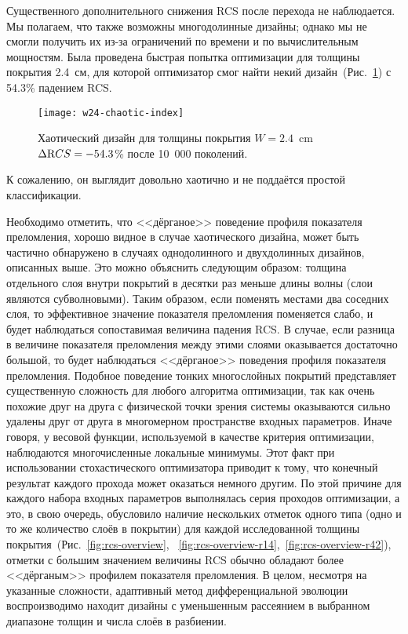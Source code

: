Существенного дополнительного снижения RCS после перехода
не наблюдается. Мы полагаем, что также возможны многодолинные дизайны;
однако мы не смогли получить их из-за ограничений по времени и по
вычислительным мощностям. Была проведена быстрая попытка оптимизации
для толщины покрытия 2.4~см, для которой оптимизатор смог найти некий
дизайн~(Рис.~\ref{fig:thick}) с 54.3\% падением RCS.
\begin{figure}
  \texttt{[image: w24-chaotic-index]}%
  \caption{Хаотический дизайн для толщины покрытия $W=2.4$~cm
    $\Delta {\textrm RCS}=-54.3$\% после 10~000 поколений.
    \label{fig:thick}}%
\end{figure}
К сожалению, он выглядит довольно хаотично и не поддаётся простой
классификации.


Необходимо отметить, что <<дёрганое>> поведение профиля показателя
преломления, хорошо видное в случае хаотического дизайна, может быть
частично обнаружено в случаях однодолинного и двухдолинных дизайнов,
описанных выше.  Это можно объяснить следующим образом: толщина
отдельного слоя внутри покрытий в десятки раз меньше длины волны (слои
являются субволновыми).  Таким образом, если поменять местами два
соседних слоя, то эффективное значение показателя преломления
поменяется слабо, и будет наблюдаться сопоставимая величина падения
RCS.  В случае, если разница в величине показателя преломления между
этими слоями оказывается достаточно большой, то будет наблюдаться
<<дёрганое>> поведения профиля показателя преломления.  Подобное
поведение тонких многослойных покрытий представляет
существенную сложность для любого алгоритма оптимизации, так как очень
похожие друг на друга с физической точки зрения системы оказываются
сильно удалены друг от друга в многомерном пространстве входных
параметров.  Иначе говоря, у весовой функции, используемой в качестве
критерия оптимизации, наблюдаются многочисленные локальные
минимумы.  Этот факт при использовании стохастического оптимизатора
приводит к тому, что конечный результат каждого прохода может
оказаться немного другим.  По этой причине для каждого набора входных
параметров выполнялась серия проходов оптимизации, а это, в свою
очередь, обусловило наличие нескольких отметок одного типа
(одно и то же количество слоёв в покрытии) для каждой исследованной
толщины покрытия~(Рис.~\ref{fig:rcs-overview},%
~\ref{fig:rcs-overview-r14},~\ref{fig:rcs-overview-r42}), отметки с
большим значением величины RCS обычно обладают более <<дёрганым>>
профилем показателя преломления.  В целом, несмотря на указанные
сложности, адаптивный метод дифференциальной эволюции воспроизводимо
находит дизайны  с уменьшенным рассеянием в выбранном диапазоне толщин
и числа слоёв в разбиении.

